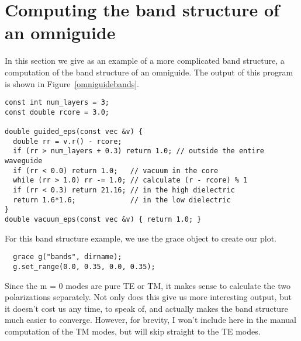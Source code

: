 \begin{comment}
#include <stdio.h>
#include <stdlib.h>

#include <meep.h>
using namespace meep;

const int a = 10;
\end{comment}

\section{Computing the band structure of an omniguide}

In this section we give as an example of a more complicated band structure,
a computation of the band structure of an omniguide.  The output of this
program is shown in Figure~\ref{omniguidebands}.

\begin{verbatim}
const int num_layers = 3;
const double rcore = 3.0;

double guided_eps(const vec &v) {
  double rr = v.r() - rcore;
  if (rr > num_layers + 0.3) return 1.0; // outside the entire waveguide
  if (rr < 0.0) return 1.0;   // vacuum in the core
  while (rr > 1.0) rr -= 1.0; // calculate (r - rcore) % 1
  if (rr < 0.3) return 21.16; // in the high dielectric
  return 1.6*1.6;             // in the low dielectric
}
double vacuum_eps(const vec &v) { return 1.0; }
\end{verbatim}

\begin{comment}
int main(int argc, char **argv) {
  initialize mpi(argc, argv);
  deal_with_ctrl_c();
  printf("Running omniguide!\n");

  const double ttot = 1000.0;
  structure s(volcyl(rcore + num_layers + 0.3, 0.0, a), guided_eps);
  const char *dirname = make_output_directory(__FILE__);
\end{comment}

For this band structure example, we use the grace object to create our
plot.
\begin{verbatim}
  grace g("bands", dirname);
  g.set_range(0.0, 0.35, 0.0, 0.35);
\end{verbatim}
\begin{comment}
  s.set_output_directory(dirname);
  structure vac(&s);
  vac.set_epsilon(vacuum_eps, false);
\end{comment}

Since the m = 0 modes are pure TE or TM, it makes sense to calculate the
two polarizations separately.  Not only does this give us more interesting
output, but it doesn't cost us any time, to speak of, and actually makes
the band structure much easier to converge.  However, for brevity, I won't
include here in the manual computation of the TM modes, but will skip
straight to the TE modes.

